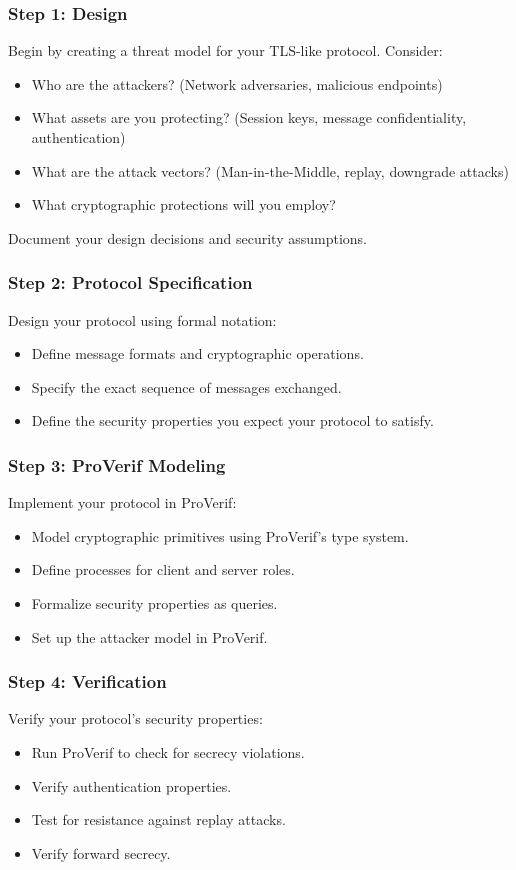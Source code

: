 \documentclass[10pt,a4paper,american]{article}
\begin{document}
\subsubsection*{Step 1: Design}
Begin by creating a threat model for your TLS-like protocol. Consider:
\begin{itemize}
	\item Who are the attackers? (Network adversaries, malicious endpoints)
	\item What assets are you protecting? (Session keys, message confidentiality, authentication)
	\item What are the attack vectors? (Man-in-the-Middle, replay, downgrade attacks)
	\item What cryptographic protections will you employ?
\end{itemize}

Document your design decisions and security assumptions.

\subsubsection*{Step 2: Protocol Specification}
Design your protocol using formal notation:
\begin{itemize}
	\item Define message formats and cryptographic operations.
	\item Specify the exact sequence of messages exchanged.
	\item Define the security properties you expect your protocol to satisfy.
\end{itemize}

\subsubsection*{Step 3: ProVerif Modeling}
Implement your protocol in ProVerif:
\begin{itemize}
	\item Model cryptographic primitives using ProVerif's type system.
	\item Define processes for client and server roles.
	\item Formalize security properties as queries.
	\item Set up the attacker model in ProVerif.
\end{itemize}

\subsubsection*{Step 4: Verification}
Verify your protocol's security properties:
\begin{itemize}
	\item Run ProVerif to check for secrecy violations.
	\item Verify authentication properties.
	\item Test for resistance against replay attacks.
	\item Verify forward secrecy.
\end{itemize}
\end{document}
